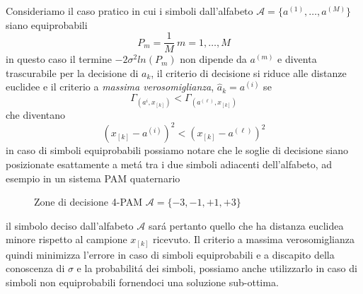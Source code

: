             Consideriamo il caso pratico in cui i simboli dall'alfabeto $\mathcal{A} = \{a^{(1)},\dots,a^{(M)}\}$ siano
            equiprobabili
            \[
                P_m=\frac{1}{M}\ m=1,\dots,M  
            \]
            in questo caso il termine $-2\sigma^2ln(P_m)$ non dipende da $a^{(m)}$ e diventa trascurabile per la decisione
            di $a_k$, il criterio di decisione si riduce alle distanze euclidee e il criterio a \emph{massima verosomiglianza}, $\hat{a}_k=a^{(i)}$ se
            \[
                \Gamma_{(a^{i},x_{[k]})} < \Gamma_{(a^{(\ell)},x_{[k]})}                    
            \]
            che diventano 
            \[
                \left(x_{[k]}-a^{(i)}\right)^2<\left(x_{[k]}-a^{(\ell)}\right)^2  
            \]
            in caso di simboli equiprobabili possiamo notare che le soglie di decisione siano posizionate esattamente a 
            metá tra i due simboli adiacenti dell'alfabeto, ad esempio in un sistema PAM quaternario
            \begin{figure}[H]
                \centering
                \caption{Zone di decisione 4-PAM $\mathcal{A} = \{-3,-1,+1,+3\}$}
            \end{figure}
            il simbolo deciso dall'alfabeto $\mathcal{A}$ sará pertanto quello che ha distanza euclidea minore rispetto al 
            campione $x_{[k]}$ ricevuto. Il criterio a massima verosomiglianza quindi minimizza l'errore in caso 
            di simboli equiprobabili e a discapito della conoscenza di $\sigma$ e la probabilitá dei simboli,
            possiamo anche utilizzarlo in caso di simboli non equiprobabili fornendoci una soluzione sub-ottima. 
